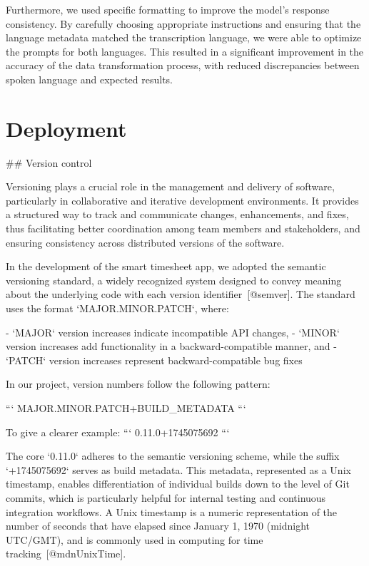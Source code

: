 \documentclass[
  digital,     %
  oneside,     %
  nosansbold,  %
  nocolorbold, %
  lof,         %
  lot,         %
]{fithesis4}
\begin{document}
\begin{markdown}
Furthermore, we used specific formatting to improve the model’s response consistency. By carefully choosing appropriate instructions and ensuring that the language metadata matched the transcription language, we were able to optimize the prompts for both languages. This resulted in a significant improvement in the accuracy of the data transformation process, with reduced discrepancies between spoken language and expected results.

\end{markdown}
\shorthandon{-}

\chapter{Deployment}
\shorthandoff{-}
\begin{markdown}

## Version control

Versioning plays a crucial role in the management and delivery of software, particularly in collaborative and iterative development environments. It provides a structured way to track and communicate changes, enhancements, and fixes, thus facilitating better coordination among team members and stakeholders, and ensuring consistency across distributed versions of the software.

In the development of the smart timesheet app, we adopted the semantic versioning standard, a widely recognized system designed to convey meaning about the underlying code with each version identifier~[@semver]. The standard uses the format `MAJOR.MINOR.PATCH`, where:

- `MAJOR` version increases indicate incompatible API changes,
- `MINOR` version increases add functionality in a backward-compatible manner, and
- `PATCH` version increases represent backward-compatible bug fixes

In our project, version numbers follow the following pattern:

```
MAJOR.MINOR.PATCH+BUILD_METADATA
```

To give a clearer example:
```
0.11.0+1745075692
```

The core `0.11.0` adheres to the semantic versioning scheme, while the suffix `+1745075692` serves as build metadata. This metadata, represented as a Unix timestamp, enables differentiation of individual builds down to the level of Git commits, which is particularly helpful for internal testing and continuous integration workflows. A Unix timestamp is a numeric representation of the number of seconds that have elapsed since January 1, 1970 (midnight UTC/GMT), and is commonly used in computing for time tracking~[@mdnUnixTime].


\end{markdown}
\end{document}
